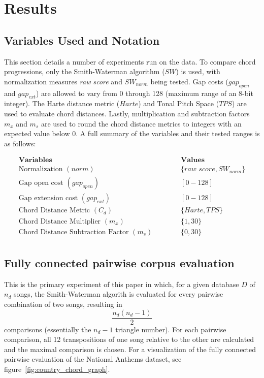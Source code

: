 \chapter{Results}

\section{Variables Used and Notation} \label{varnot}

This section details a number of experiments run on the data. To compare chord progressions, only the Smith-Waterman algorithm ($SW$) is used, with normalization measures \textit{raw score} and ${SW}_{norm}$ being tested. Gap costs (${gap}_{open}$ and ${gap}_{ext}$) are allowed to vary from 0 through 128 (maximum range of an 8-bit integer). The Harte distance metric ($Harte$) and Tonal Pitch Space ($TPS$) are used to evaluate chord distances. Lastly, multiplication and subtraction factors $m_x$ and $m_s$ are used to round the chord distance metrics to integers with an expected value below 0. A full summary of the variables and their tested ranges is as follows:

\begin{align*}
\textbf{Variables}                       & \hspace{1cm} & \textbf{Values} \\
\text{Normalization } (norm)                    && \{\textit{raw score},{SW}_{norm}\} \\
\text{Gap open cost } ({gap}_{open})                    && [0-128] \\
\text{Gap extension cost } ({gap}_{ext})                && [0-128] \\
\text{Chord Distance Metric } (C_d)            && \{Harte, TPS\} \\
\text{Chord Distance Multiplier } (m_x)       && \{1, 30\} \\
\text{Chord Distance Subtraction Factor } (m_s) && \{0, 30\} \\
\end{align*}

\section{Fully connected pairwise corpus evaluation}

This is the primary experiment of this paper in which, for a given database $D$ of $n_d$ songs, the Smith-Waterman algorith is evaluated for every pairwise combination of two songs, resulting in \[ \frac{n_d (n_d - 1)}{2} \] comparisons (essentially the $n_d - 1$ triangle number). For each pairwise comparison, all 12 transpositions of one song relative to the other are calculated and the maximal comparison is chosen. For a visualization of the fully connected pairwise evaluation of the National Anthems dataset, see figure~\ref{fig:country_chord_graph}.